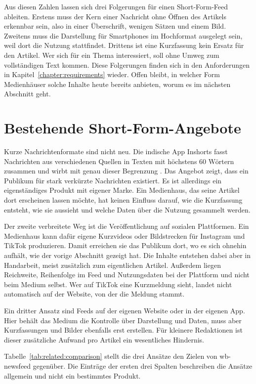 Aus diesen Zahlen lassen sich drei Folgerungen für einen Short-Form-Feed ableiten.
Erstens muss der Kern einer Nachricht ohne Öffnen des Artikels erkennbar sein, also in einer Überschrift, wenigen Sätzen und einem Bild.
Zweitens muss die Darstellung für Smartphones im Hochformat ausgelegt sein, weil dort die Nutzung stattfindet.
Drittens ist eine Kurzfassung kein Ersatz für den Artikel.
Wer sich für ein Thema interessiert, soll ohne Umweg zum vollständigen Text kommen.
Diese Folgerungen finden sich in den Anforderungen in Kapitel~\ref{chapter:requirements} wieder.
Offen bleibt, in welcher Form Medienhäuser solche Inhalte heute bereits anbieten, worum es im nächsten Abschnitt geht.

\section{Bestehende Short-Form-Angebote}
\setauthor{\secondauthor}

Kurze Nachrichtenformate sind nicht neu.
Die indische App Inshorts fasst Nachrichten aus verschiedenen Quellen in Texten mit höchstens 60 Wörtern zusammen und wirbt mit genau dieser Begrenzung \cite{inshorts}.
Das Angebot zeigt, dass ein Publikum für stark verkürzte Nachrichten existiert.
Es ist allerdings ein eigenständiges Produkt mit eigener Marke.
Ein Medienhaus, das seine Artikel dort erscheinen lassen möchte, hat keinen Einfluss darauf, wie die Kurzfassung entsteht, wie sie aussieht und welche Daten über die Nutzung gesammelt werden.

Der zweite verbreitete Weg ist die Veröffentlichung auf sozialen Plattformen.
Ein Medienhaus kann dafür eigene Kurzvideos oder Bildstrecken für Instagram und TikTok produzieren.
Damit erreichen sie das Publikum dort, wo es sich ohnehin aufhält, wie der vorige Abschnitt gezeigt hat.
Die Inhalte entstehen dabei aber in Handarbeit, meist zusätzlich zum eigentlichen Artikel.
Außerdem liegen Reichweite, Reihenfolge im Feed und Nutzungsdaten bei der Plattform und nicht beim Medium selbst.
Wer auf TikTok eine Kurzmeldung sieht, landet nicht automatisch auf der Website, von der die Meldung stammt.

Ein dritter Ansatz sind Feeds auf der eigenen Website oder in der eigenen App.
Hier behält das Medium die Kontrolle über Darstellung und Daten, muss aber Kurzfassungen und Bilder ebenfalls erst erstellen.
Für kleinere Redaktionen ist dieser zusätzliche Aufwand pro Artikel ein wesentliches Hindernis.

Tabelle~\ref{tab:related:comparison} stellt die drei Ansätze den Zielen von wb-newsfeed gegenüber.
Die Einträge der ersten drei Spalten beschreiben die Ansätze allgemein und nicht ein bestimmtes Produkt.


